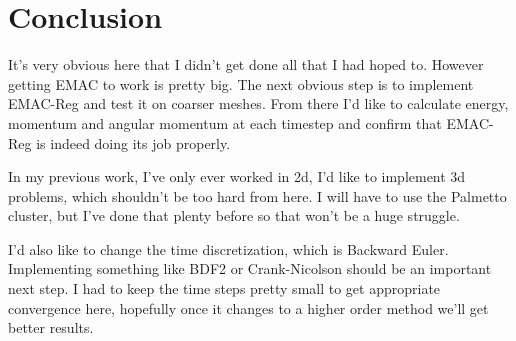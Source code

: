 \documentclass[12pt]{article}
\numberwithin{equation}{section}
\begin{document}
\section{Conclusion}

It's very obvious here that I didn't get done all that I had hoped to.  However getting EMAC to work is pretty big.  The next obvious step is to implement EMAC-Reg and test it on coarser meshes.  From there I'd like to calculate energy, momentum and angular momentum at each timestep and confirm that EMAC-Reg is indeed doing its job properly.

In my previous work, I've only ever worked in 2d, I'd like to implement 3d problems, which shouldn't be too hard from here.  I will have to use the Palmetto cluster, but I've done that plenty before so that won't be a huge struggle.

I'd also like to change the time discretization, which is Backward Euler.  Implementing something like BDF2 or Crank-Nicolson should be an important next step.  I had to keep the time steps pretty small to get appropriate convergence here, hopefully once it changes to a higher order method we'll get better results.




\end{document}
